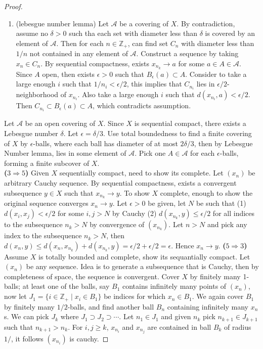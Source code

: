 \documentclass[10.5pt]{article}
\newcommand{\Z}{\mathbb{Z}}
\newcommand{\calA}{\mathcal{A}}
\begin{document}
\begin{theorem*}
\begin{proof}
\begin{enumerate}
            \item (lebesgue number lemma) Let $\calA$ be a covering of $X$. By contradiction, assume no $\delta>0$ such tha each set with diameter less than $\delta$ is covered by an element of $\calA$. Then for each $n \in \Z_+$, can find set $C_n$ with diameter less than $1/n$ not contained in any element of $\calA$. Construct a sequence by taking $x_n \in C_n$. By sequential compactness, exists $x_{n_k} \to a$ for some $a\in A\in \calA$. Since $A$ open, then exists $\epsilon>0$ such that $B_{\epsilon}(a)\subset A$. Consider to take a large enough $i$ such that $1/n_i < \epsilon/2$, this implies that $C_{n_i}$ lies in $\epsilon/2$-neighborhood of $x_{n_i}$. Also take a large enough $i$ such that $d(x_{n_i}, a) < \epsilon/2$. Then $C_{n_i} \subset B_{\epsilon}(a) \subset A$, which contradicts assumption.
        \end{enumerate}
        Let $\calA$ be an open covering of $X$. Since $X$ is sequential compact, there exists a Lebesgue number $\delta$. Let $\epsilon = \delta/3$. Use total boundedness to find a finite covering of $X$ by $\epsilon$-balls, where each ball has diameter of at most $2\delta/3$, then by Lebesgue Number lemma, lies in some element of $\calA$. Pick one $A\in\calA$ for each $\epsilon$-balls, forming a finite subcover of $X$. \\
        \textbf{($3\Rightarrow 5$)} Given $X$ sequentially compact, need to show its complete. Let $(x_n)$ be arbitrary Cauchy sequence. By sequential compactness, exists a convergent subsequence $y\in X$ such that $x_{n_k} \to y$. To show $X$ complete, enough to show the original sequence converges $x_n \to y$. Let $\epsilon>0$ be given, let $N$ be such that (1) $d(x_i, x_j) < \epsilon/2$ for some $i,j>N$ by Cauchy (2) $d(x_{n_k}, y)
        \leq \epsilon/2$ for all indices to the subsequence $n_k>N$ by convergence of $(x_{n_k})$. Let $n>N$ and pick any index to the subsequence $n_k > N$, then $d(x_n, y) \leq d(x_n, x_{n_k}) + d(x_{n_k}, y) = \epsilon/2+\epsilon/2 = \epsilon$. Hence $x_n \to y$. \textbf{($5 \Rightarrow 3$)} Assume $X$ is totally bounded and complete, show its sequantially compact. Let $(x_n)$ be any sequence. Idea is to generate a subsequence that is Cauchy, then by completeness of space, the sequence is convergent. Cover $X$ by finitely many 1-balls; at least one of the balls, say $B_1$ contains infinitely many points of $(x_n)$, now let $J_1 = \{i\in \Z_+ \mid x_i \in B_1 \}$ be indices for which $x_n\in B_1$. We again cover $B_1$ by finitely many $1/2$-balls, and find another ball $B_n$ containing infinitely many $x_n$s. We can pick $J_k$ where $J_1 \supset J_2 \supset \cdots$. Let $n_1\in J_1$ and given $n_k$ pick $n_{k+1}\in J_{k+1}$ such that $n_{k+1}>n_k$. For $i,j\geq k$, $x_{n_i}$ and $x_{n_j}$ are contained in ball $B_k$ of radius $1/$, it follows $(x_{n_i})$ is cauchy.
    \end{proof}
\end{theorem*}
\end{document}
